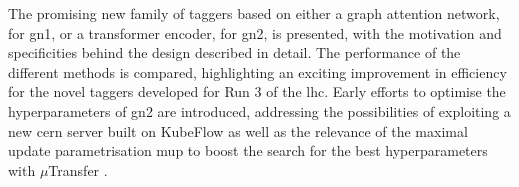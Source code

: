 The promising new family of taggers based on either a graph attention network, for \gls{gn1}, or a transformer encoder, for \gls{gn2}, is presented, with the motivation and specificities behind the design described in detail. The performance of the different methods is compared, highlighting an exciting improvement in efficiency for the novel taggers developed for Run 3 of the \gls{lhc}. Early efforts to optimise the hyperparameters of \gls{gn2} are introduced, addressing the possibilities of exploiting a new \gls{cern} server built on KubeFlow as well as the relevance of the maximal update parametrisation \gls{mup} to boost the search for the best hyperparameters with $\mu$Transfer \cite{yang2021tuning}. 


